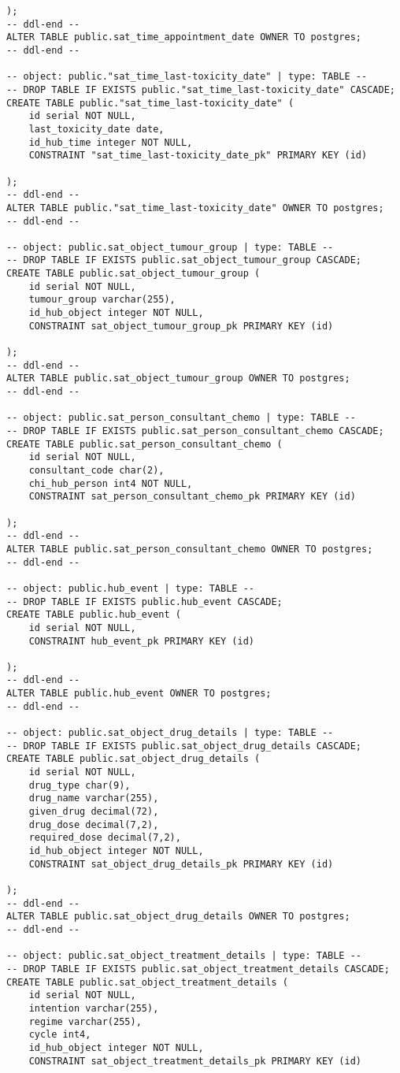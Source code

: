 \begin{lstlisting}
);
-- ddl-end --
ALTER TABLE public.sat_time_appointment_date OWNER TO postgres;
-- ddl-end --

-- object: public."sat_time_last-toxicity_date" | type: TABLE --
-- DROP TABLE IF EXISTS public."sat_time_last-toxicity_date" CASCADE;
CREATE TABLE public."sat_time_last-toxicity_date" (
	id serial NOT NULL,
	last_toxicity_date date,
	id_hub_time integer NOT NULL,
	CONSTRAINT "sat_time_last-toxicity_date_pk" PRIMARY KEY (id)

);
-- ddl-end --
ALTER TABLE public."sat_time_last-toxicity_date" OWNER TO postgres;
-- ddl-end --

-- object: public.sat_object_tumour_group | type: TABLE --
-- DROP TABLE IF EXISTS public.sat_object_tumour_group CASCADE;
CREATE TABLE public.sat_object_tumour_group (
	id serial NOT NULL,
	tumour_group varchar(255),
	id_hub_object integer NOT NULL,
	CONSTRAINT sat_object_tumour_group_pk PRIMARY KEY (id)

);
-- ddl-end --
ALTER TABLE public.sat_object_tumour_group OWNER TO postgres;
-- ddl-end --

-- object: public.sat_person_consultant_chemo | type: TABLE --
-- DROP TABLE IF EXISTS public.sat_person_consultant_chemo CASCADE;
CREATE TABLE public.sat_person_consultant_chemo (
	id serial NOT NULL,
	consultant_code char(2),
	chi_hub_person int4 NOT NULL,
	CONSTRAINT sat_person_consultant_chemo_pk PRIMARY KEY (id)

);
-- ddl-end --
ALTER TABLE public.sat_person_consultant_chemo OWNER TO postgres;
-- ddl-end --

-- object: public.hub_event | type: TABLE --
-- DROP TABLE IF EXISTS public.hub_event CASCADE;
CREATE TABLE public.hub_event (
	id serial NOT NULL,
	CONSTRAINT hub_event_pk PRIMARY KEY (id)

);
-- ddl-end --
ALTER TABLE public.hub_event OWNER TO postgres;
-- ddl-end --

-- object: public.sat_object_drug_details | type: TABLE --
-- DROP TABLE IF EXISTS public.sat_object_drug_details CASCADE;
CREATE TABLE public.sat_object_drug_details (
	id serial NOT NULL,
	drug_type char(9),
	drug_name varchar(255),
	given_drug decimal(72),
	drug_dose decimal(7,2),
	required_dose decimal(7,2),
	id_hub_object integer NOT NULL,
	CONSTRAINT sat_object_drug_details_pk PRIMARY KEY (id)

);
-- ddl-end --
ALTER TABLE public.sat_object_drug_details OWNER TO postgres;
-- ddl-end --

-- object: public.sat_object_treatment_details | type: TABLE --
-- DROP TABLE IF EXISTS public.sat_object_treatment_details CASCADE;
CREATE TABLE public.sat_object_treatment_details (
	id serial NOT NULL,
	intention varchar(255),
	regime varchar(255),
	cycle int4,
	id_hub_object integer NOT NULL,
	CONSTRAINT sat_object_treatment_details_pk PRIMARY KEY (id)


\end{lstlisting}
